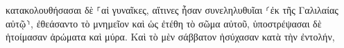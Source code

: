 \documentclass{openreader}
\begin{document}
κατακολουθήσασαι δὲ ⸀αἱ γυναῖκες, αἵτινες ἦσαν συνεληλυθυῖαι ⸂ἐκ τῆς Γαλιλαίας αὐτῷ⸃, ἐθεάσαντο τὸ μνημεῖον καὶ ὡς ἐτέθη τὸ σῶμα αὐτοῦ, 
ὑποστρέψασαι δὲ ἡτοίμασαν ἀρώματα καὶ μύρα. Καὶ τὸ μὲν σάββατον ἡσύχασαν κατὰ τὴν ἐντολήν, 
\end{document}
